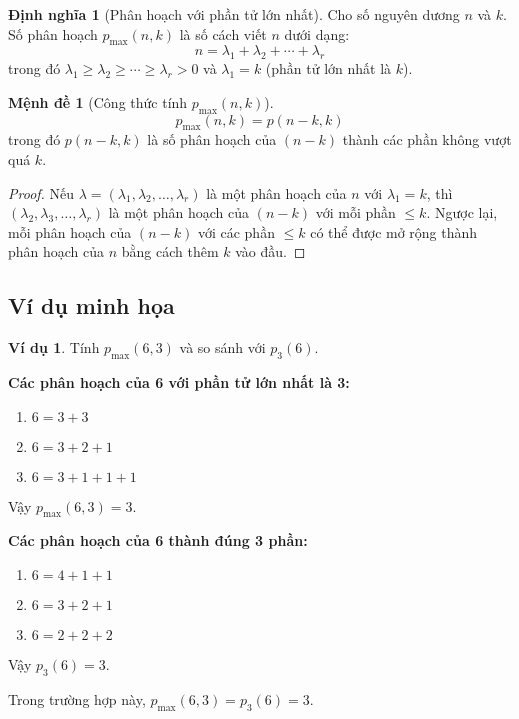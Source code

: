\documentclass[12pt,a4paper]{article}
\theoremstyle{definition}
\newtheorem{definition}{Định nghĩa}
\newtheorem{proposition}{Mệnh đề}
\newtheorem{example}{Ví dụ}
\begin{document}
\begin{definition}[Phân hoạch với phần tử lớn nhất]
Cho số nguyên dương $n$ và $k$. Số phân hoạch $p_{\max}(n, k)$ là số cách viết $n$ dưới dạng:
$$n = \lambda_1 + \lambda_2 + \cdots + \lambda_r$$
trong đó $\lambda_1 \geq \lambda_2 \geq \cdots \geq \lambda_r > 0$ và $\lambda_1 = k$ (phần tử lớn nhất là $k$).
\end{definition}

\begin{proposition}[Công thức tính $p_{\max}(n,k)$]
$$p_{\max}(n, k) = p(n-k, k)$$
trong đó $p(n-k, k)$ là số phân hoạch của $(n-k)$ thành các phần không vượt quá $k$.
\end{proposition}

\begin{proof}
Nếu $\lambda = (\lambda_1, \lambda_2, \ldots, \lambda_r)$ là một phân hoạch của $n$ với $\lambda_1 = k$, thì $(\lambda_2, \lambda_3, \ldots, \lambda_r)$ là một phân hoạch của $(n-k)$ với mỗi phần $\leq k$. Ngược lại, mỗi phân hoạch của $(n-k)$ với các phần $\leq k$ có thể được mở rộng thành phân hoạch của $n$ bằng cách thêm $k$ vào đầu.
\end{proof}

\subsection{Ví dụ minh họa}

\begin{example}
Tính $p_{\max}(6, 3)$ và so sánh với $p_3(6)$.

\textbf{Các phân hoạch của 6 với phần tử lớn nhất là 3:}
\begin{enumerate}
\item $6 = 3 + 3$
\item $6 = 3 + 2 + 1$ 
\item $6 = 3 + 1 + 1 + 1$
\end{enumerate}

Vậy $p_{\max}(6, 3) = 3$.

\textbf{Các phân hoạch của 6 thành đúng 3 phần:}
\begin{enumerate}
\item $6 = 4 + 1 + 1$
\item $6 = 3 + 2 + 1$
\item $6 = 2 + 2 + 2$
\end{enumerate}

Vậy $p_3(6) = 3$.

Trong trường hợp này, $p_{\max}(6, 3) = p_3(6) = 3$.
\end{example}
\end{document}
